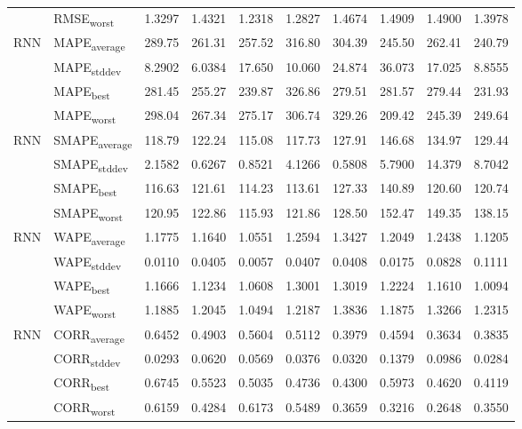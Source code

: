 {\begin{longtable}{l l c c c c c c c c}
 & RMSE\textsubscript{worst} & 1.3297 & 1.4321 & 1.2318 & 1.2827 & 1.4674 & 1.4909 & 1.4900 & 1.3978 \\
\cmidrule(lr){2-10}
\multirow{4}{*}{RNN} & MAPE\textsubscript{average} & 289.75 & 261.31 & 257.52 & 316.80 & 304.39 & 245.50 & 262.41 & 240.79 \\
 & MAPE\textsubscript{stddev} & 8.2902 & 6.0384 & 17.650 & 10.060 & 24.874 & 36.073 & 17.025 & 8.8555 \\
 & MAPE\textsubscript{best} & 281.45 & 255.27 & 239.87 & 326.86 & 279.51 & 281.57 & 279.44 & 231.93 \\
 & MAPE\textsubscript{worst} & 298.04 & 267.34 & 275.17 & 306.74 & 329.26 & 209.42 & 245.39 & 249.64 \\
\cmidrule(lr){2-10}
\multirow{4}{*}{RNN} & SMAPE\textsubscript{average} & 118.79 & 122.24 & 115.08 & 117.73 & 127.91 & 146.68 & 134.97 & 129.44 \\
 & SMAPE\textsubscript{stddev} & 2.1582 & 0.6267 & 0.8521 & 4.1266 & 0.5808 & 5.7900 & 14.379 & 8.7042 \\
 & SMAPE\textsubscript{best} & 116.63 & 121.61 & 114.23 & 113.61 & 127.33 & 140.89 & 120.60 & 120.74 \\
 & SMAPE\textsubscript{worst} & 120.95 & 122.86 & 115.93 & 121.86 & 128.50 & 152.47 & 149.35 & 138.15 \\
\cmidrule(lr){2-10}
\multirow{4}{*}{RNN} & WAPE\textsubscript{average} & 1.1775 & 1.1640 & 1.0551 & 1.2594 & 1.3427 & 1.2049 & 1.2438 & 1.1205 \\
 & WAPE\textsubscript{stddev} & 0.0110 & 0.0405 & 0.0057 & 0.0407 & 0.0408 & 0.0175 & 0.0828 & 0.1111 \\
 & WAPE\textsubscript{best} & 1.1666 & 1.1234 & 1.0608 & 1.3001 & 1.3019 & 1.2224 & 1.1610 & 1.0094 \\
 & WAPE\textsubscript{worst} & 1.1885 & 1.2045 & 1.0494 & 1.2187 & 1.3836 & 1.1875 & 1.3266 & 1.2315 \\
\cmidrule(lr){2-10}
\multirow{4}{*}{RNN} & CORR\textsubscript{average} & 0.6452 & 0.4903 & 0.5604 & 0.5112 & 0.3979 & 0.4594 & 0.3634 & 0.3835 \\
 & CORR\textsubscript{stddev} & 0.0293 & 0.0620 & 0.0569 & 0.0376 & 0.0320 & 0.1379 & 0.0986 & 0.0284 \\
 & CORR\textsubscript{best} & 0.6745 & 0.5523 & 0.5035 & 0.4736 & 0.4300 & 0.5973 & 0.4620 & 0.4119 \\
 & CORR\textsubscript{worst} & 0.6159 & 0.4284 & 0.6173 & 0.5489 & 0.3659 & 0.3216 & 0.2648 & 0.3550 \\

\end{longtable}}
